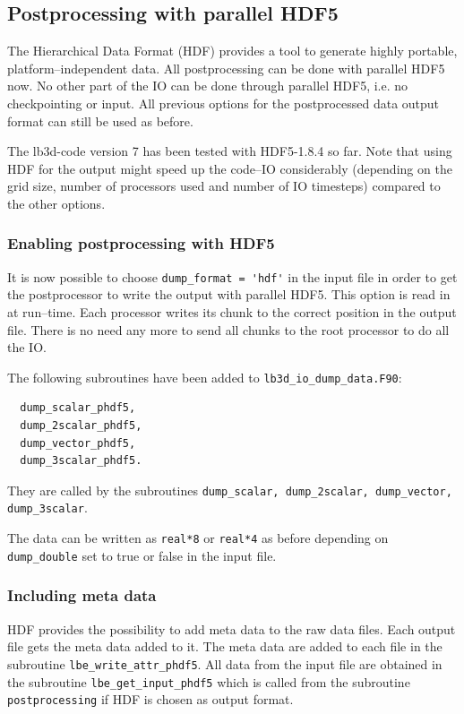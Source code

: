 \documentclass[a4paper]{article}
\begin{document}
\subsection{Postprocessing with parallel HDF5}
The Hierarchical Data Format (HDF) \cite{bib:hdf5} provides a tool to generate highly portable, platform--independent data.
All postprocessing can be done with parallel HDF5 now. No other part of the IO can be done through parallel HDF5, i.e. no checkpointing or input. All previous options for the postprocessed data output format can still be used as before.

The lb3d-code version 7 has been tested with HDF5-1.8.4 so far.
Note that using HDF for the output might speed up the code--IO considerably (depending on the grid size, number of processors used and number of IO timesteps) compared to the other options.


\subsubsection*{Enabling postprocessing with HDF5}
It is now possible to choose \verb+dump_format = 'hdf'+ in the input file in order to get the postprocessor to write the output with parallel HDF5. This option is read in at run--time. Each processor writes its chunk to the correct position in the output file. There is no need any more to send all chunks to the root processor to do all the IO. 

The following subroutines have been added to \verb+lb3d_io_dump_data.F90+:
\begin{verbatim}
  dump_scalar_phdf5,
  dump_2scalar_phdf5,
  dump_vector_phdf5,
  dump_3scalar_phdf5.
\end{verbatim}
They are called by the subroutines \verb+dump_scalar, dump_2scalar, dump_vector, dump_3scalar+.

The data can be written as \verb+real*8+ or \verb+real*4+ as before depending on \verb+dump_double+ set to true or false in the input file.

\subsubsection*{Including meta data}
HDF provides the possibility to add meta data to the raw data files.
Each output file gets the meta data added to it. The meta data are added to each file in the subroutine \verb+lbe_write_attr_phdf5+. All data from the input file are obtained in the subroutine \verb+lbe_get_input_phdf5+ which is called from the subroutine \verb+postprocessing+ if HDF is chosen as output format. 
\end{document}
